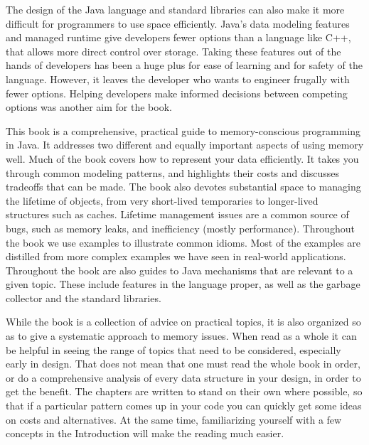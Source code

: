 The design of the Java language and standard libraries can also make it more difficult for programmers to use space efficiently.  Java's data modeling features and managed runtime give developers fewer options than a language like C++, that allows more direct control over storage. Taking these features out of the hands of developers has been a huge plus for ease of learning and for safety of the language. However, it leaves the developer who wants to engineer frugally with fewer options. %
Helping developers make informed decisions between competing options was another aim for the book.





This book is a comprehensive, practical guide to memory-conscious programming in Java. It addresses two different and equally important aspects of using memory well. Much of the book covers how to represent your data efficiently. It takes you through common modeling patterns, and highlights their costs and discusses tradeoffs that can be made. The book also devotes substantial space to managing the lifetime of objects, from very short-lived temporaries to longer-lived structures such as caches. Lifetime management issues are a common source of bugs, such as memory leaks, and inefficiency (mostly performance).  Throughout the book we use examples to illustrate common idioms. Most of the examples are distilled from more complex examples we have seen in real-world applications.  Throughout the book are also guides to Java mechanisms that are relevant to a given topic.  These include features in the language proper, as well as the garbage collector and the standard libraries.

While the book is a collection of advice on practical topics, it is also organized so as to give a systematic approach to memory issues. When read as a whole it can be helpful in seeing the range of topics that need to be considered, especially early in design. That does not mean that one must read the whole book in order, or do a comprehensive analysis of every data structure in your design, in order to get the benefit. The chapters are written to stand on their own where possible, so that if a particular pattern comes up in your code you can quickly get some ideas on costs and alternatives. At the same time, familiarizing yourself with a few concepts in the Introduction will make the reading much easier.



